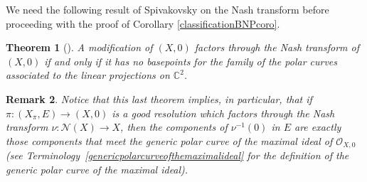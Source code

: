 \documentclass[reqno,dvipsnames,12pt]{amsart}
\newtheorem{thm}{Theorem}[section]
\newtheorem{rema}[thm]{Remark}
\begin{document}
We need the following result of Spivakovsky on the Nash transform before proceeding with the proof of Corollary \ref{classificationBNPcoro}.

\begin{thm}[{\cite[Theorem 1.2]{Spivakovsky1990}}]\label{spivaknash}
		A modification of $(X,0)$ factors through the Nash transform of $(X,0)$ if and only if it has no basepoints for the family of the polar curves associated to the linear projections on $\mathbb{C}^2$.
	\end{thm}	
	\begin{rema}\label{laremarquedespivakovski}
	Notice that this last theorem implies, in particular, that if $\pi:(X_\pi,E) \longrightarrow (X,0)$ is a good resolution which factors through the Nash transform $\nu:\mathcal{N}(X) \longrightarrow X$, then the components of $\nu^{-1}(0)$ in $E$ are exactly those components that meet the generic polar curve of the maximal ideal of $\mathcal{O}_{X,0}$ (see Terminology~\ref{genericpolarcurveofthemaximalideal} for the definition of the generic polar curve of the maximal ideal).
	\end{rema}
\end{document}
